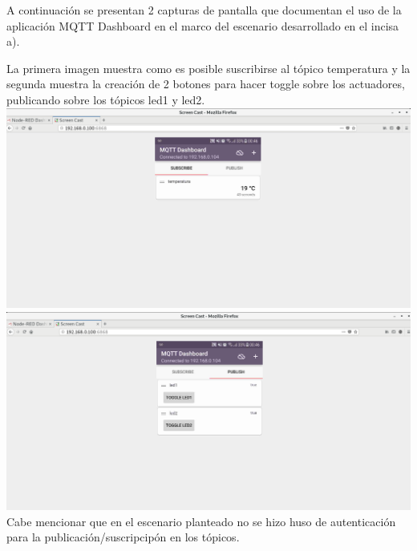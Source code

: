 \documentclass[11pt]{extarticle}
\begin{document}
    A continuación se presentan 2 capturas de pantalla que documentan el uso
de la aplicación MQTT Dashboard en el marco del escenario desarrollado
en el incisa a).

La primera imagen muestra como es posible suscribirse al tópico
temperatura y la segunda muestra la creación de 2 botones para hacer
toggle sobre los actuadores, publicando sobre los tópicos led1 y led2.\\

    \includegraphics{images/dashboard-subs.png}\\

    \includegraphics{images/dashboard-pub.png}\\

    Cabe mencionar que en el escenario planteado no se hizo huso de
autenticación para la publicación/suscripcipón en los tópicos.


    
    



    
    
\end{document}
